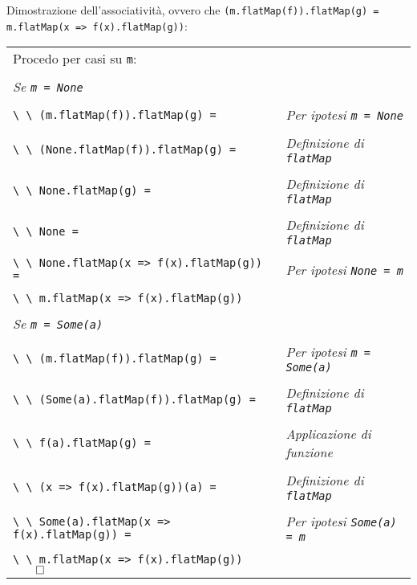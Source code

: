 Dimostrazione dell'associatività, ovvero che \lstinline{(m.flatMap(f)).flatMap(g) = m.flatMap(x => f(x).flatMap(g))}:

\begin{tabularx}{\textwidth}{ll}
  Procedo per casi su \lstinline{m}:                    &                                              \\
                                                        &                                              \\
  \emph{Se \lstinline{m = None}}                        &                                              \\
  \\
  \lstinline{\ \ (m.flatMap(f)).flatMap(g) =} & \emph{Per ipotesi \lstinline{m = None}}                \\
  \\
  \lstinline{\ \ (None.flatMap(f)).flatMap(g) =} & \emph{Definizione di \lstinline{flatMap}}           \\
  \\
  \lstinline{\ \ None.flatMap(g) =} & \emph{Definizione di \lstinline{flatMap}}                        \\
  \\
  \lstinline{\ \ None =} & \emph{Definizione di \lstinline{flatMap}}                                   \\
  \\
  \lstinline{\ \ None.flatMap(x => f(x).flatMap(g)) =} & \emph{Per ipotesi \lstinline{None = m}}       \\
  \\
  \lstinline{\ \ m.flatMap(x => f(x).flatMap(g))}       &                                              \\
  \\
  \emph{Se \lstinline{m = Some(a)}}                     &                                              \\
  \\
  \lstinline{\ \ (m.flatMap(f)).flatMap(g) =} & \emph{Per ipotesi \lstinline{m = Some(a)}}             \\
  \\
  \lstinline{\ \ (Some(a).flatMap(f)).flatMap(g) =} & \emph{Definizione di \lstinline{flatMap}}        \\
  \\
  \lstinline{\ \ f(a).flatMap(g) =} & \emph{Applicazione di funzione}                                  \\
  \\
  \lstinline{\ \ (x => f(x).flatMap(g))(a) =} & \emph{Definizione di \lstinline{flatMap}}              \\
  \\
  \lstinline{\ \ Some(a).flatMap(x => f(x).flatMap(g)) =} & \emph{Per ipotesi \lstinline{Some(a) = m}} \\
  \\
  \lstinline{\ \ m.flatMap(x => f(x).flatMap(g))}$\qed$ &
\end{tabularx}


